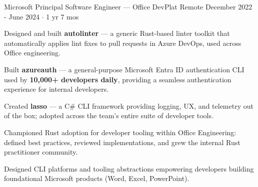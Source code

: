 \documentclass[11pt, a4paper]{awesome-cv}
\begin{document}
\begin{cventries}
  \cventry
    {Microsoft}
    {Principal Software Engineer — Office DevPlat}
    {Remote}
    {December 2022 - June 2024 $\cdot$ 1 yr 7 mos}
    {
      \begin{cvitems}
        \item Designed and built \textbf{autolinter} — a generic Rust-based linter toolkit that automatically applies lint fixes to pull requests in Azure DevOps, used across Office engineering.
        \item Built \textbf{azureauth} — a general-purpose Microsoft Entra ID authentication CLI used by \textbf{10,000+ developers daily}, providing a seamless authentication experience for internal developers.
        \item Created \textbf{lasso} — a C\# CLI framework providing logging, UX, and telemetry out of the box; adopted across the team's entire suite of developer tools.
        \item Championed Rust adoption for developer tooling within Office Engineering: defined best practices, reviewed implementations, and grew the internal Rust practitioner community.
      \end{cvitems}
    }
    {Designed CLI platforms and tooling abstractions empowering developers building foundational Microsoft products (Word, Excel, PowerPoint).}


\end{cventries}
\end{document}
